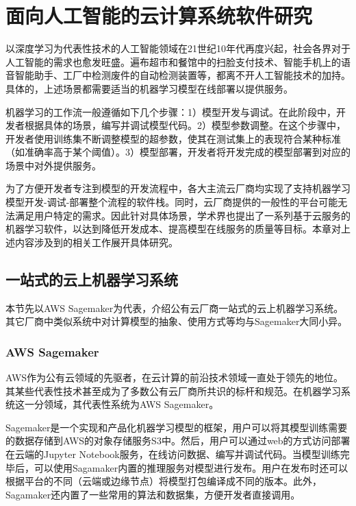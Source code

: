 
\chapter{面向人工智能的云计算系统软件研究}
以深度学习为代表性技术的人工智能领域在21世纪10年代再度兴起，社会各界对于人工智能的需求也愈发旺盛。遍布超市和餐馆中的扫脸支付技术、智能手机上的语音智能助手、工厂中检测废件的自动检测装置等，都离不开人工智能技术的加持。具体的，上述场景都需要适当的机器学习模型在线部署以提供服务。

机器学习的工作流一般遵循如下几个步骤：1）模型开发与调试。在此阶段中，开发者根据具体的场景，编写并调试模型代码。2）模型参数调整。在这个步骤中，开发者使用训练集不断调整模型的超参数，使其在测试集上的表现符合某种标准（如准确率高于某个阈值）。3）模型部署，开发者将开发完成的模型部署到对应的场景中对外提供服务。

为了方便开发者专注到模型的开发流程中，各大主流云厂商均实现了支持机器学习模型开发-调试-部署整个流程的软件栈。同时，云厂商提供的一般性的平台可能无法满足用户特定的需求。因此针对具体场景，学术界也提出了一系列基于云服务的机器学习软件，以达到降低开发成本、提高模型在线服务的质量等目标。本章对上述内容涉及到的相关工作展开具体研究。

\section{一站式的云上机器学习系统}

本节先以AWS Sagemaker为代表，介绍公有云厂商一站式的云上机器学习系统。其它厂商中类似系统中对计算模型的抽象、使用方式等均与Sagemaker大同小异。

\subsection{AWS Sagemaker}\label{subsec_sagemaker}
AWS作为公有云领域的先驱者，在云计算的前沿技术领域一直处于领先的地位。其某些代表性技术甚至成为了多数公有云厂商所共识的标杆和规范。在机器学习系统这一分领域，其代表性系统为AWS Sagemaker。

Sagemaker是一个实现和产品化机器学习模型的框架\parencite{joshi2020amazon}，用户可以将其模型训练需要的数据存储到AWS的对象存储服务S3中。然后，用户可以通过web的方式访问部署在云端的Jupyter Notebook服务，在线访问数据、编写并调试代码。当模型训练完毕后，可以使用Sagamaker内置的推理服务对模型进行发布。用户在发布时还可以根据平台的不同（云端或边缘节点）将模型打包编译成不同的版本。此外，Sagamaker还内置了一些常用的算法和数据集，方便开发者直接调用。

